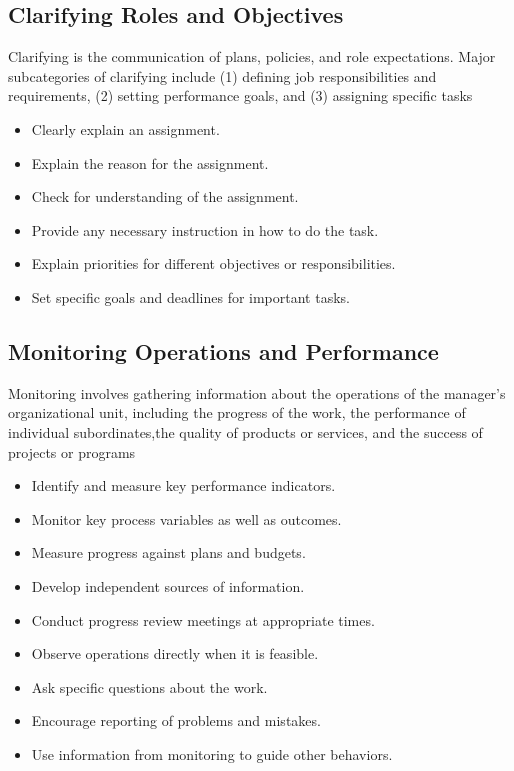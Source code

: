 \subsection{Clarifying Roles and Objectives} %
\label{ssub:clarifying_roles_and_objectives}
Clarifying is the communication of plans, policies, and role expectations. Major subcategories of clarifying include (1) defining job responsibilities and requirements, (2) setting performance goals, and (3) assigning specific tasks

\begin{itemize}
	\item Clearly explain an assignment.
	\item Explain the reason for the assignment.
	\item Check for understanding of the assignment.
	\item Provide any necessary instruction in how to do the task.
	\item Explain priorities for different objectives or responsibilities.
	\item Set specific goals and deadlines for important tasks.
\end{itemize}



\subsection{Monitoring Operations and Performance} %
\label{ssub:monitoring_operations_and_performance}

Monitoring involves gathering information about the operations of the manager’s organizational unit, including the progress of the work, the performance of individual subordinates,the quality of products or services, and the success of projects or programs

\begin{itemize}
	\item Identify and measure key performance indicators.
	\item Monitor key process variables as well as outcomes.
	\item Measure progress against plans and budgets.
	\item Develop independent sources of information.
	\item Conduct progress review meetings at appropriate times.
	\item Observe operations directly when it is feasible.
	\item Ask specific questions about the work.
	\item Encourage reporting of problems and mistakes.
	\item Use information from monitoring to guide other behaviors.
\end{itemize}

